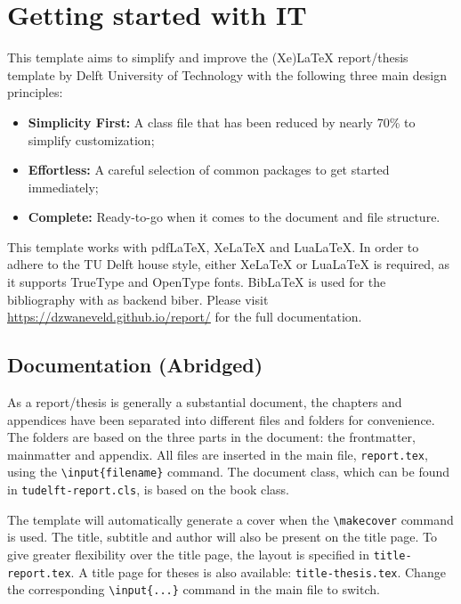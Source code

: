 \chapter{Getting started with IT}

This template aims to simplify and improve the (Xe)LaTeX report/thesis template by Delft University of Technology with the following three main design principles:

\begin{itemize}
  \item \textbf{Simplicity First:} A class file that has been reduced by nearly 70\% to simplify customization;
  \item \textbf{Effortless:} A careful selection of common packages to get started immediately;
  \item \textbf{Complete:} Ready-to-go when it comes to the document and file structure.
\end{itemize}

\noindent This template works with pdfLaTeX, XeLaTeX and LuaLaTeX. In order to adhere to the TU Delft house style, either XeLaTeX or LuaLaTeX is required, as it supports TrueType and OpenType fonts. BibLaTeX is used for the bibliography with as backend biber. Please visit \url{https://dzwaneveld.github.io/report/} for the full documentation.

\section*{Documentation (Abridged)}

As a report/thesis is generally a substantial document, the chapters and appendices have been separated into different files and folders for convenience. The folders are based on the three parts in the document: the frontmatter, mainmatter and appendix. All files are inserted in the main file, \texttt{report.tex}, using the \texttt{\textbackslash input\{filename\}} command. The document class, which can be found in \texttt{tudelft-report.cls}, is based on the book class. 

The template will automatically generate a cover when the \texttt{\textbackslash makecover} command is used. The title, subtitle and author will also be present on the title page. To give greater flexibility over the title page, the layout is specified in \texttt{title-report.tex}. A title page for theses is also available: \texttt{title-thesis.tex}. Change the corresponding \texttt{\textbackslash input\{...\}} command in the main file to switch. 

